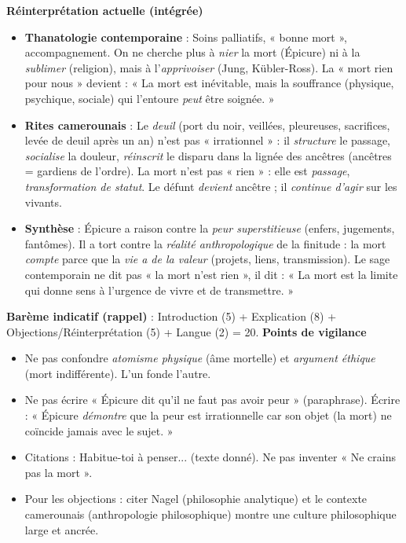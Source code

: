 \documentclass[11pt]{article}
\begin{document}
\begin{corrige}
\textbf{Réinterprétation actuelle (intégrée)}\par
\begin{itemize}
\item \textbf{Thanatologie contemporaine} : Soins palliatifs, « bonne mort », accompagnement. On ne cherche plus à \emph{nier} la mort (Épicure) ni à la \emph{sublimer} (religion), mais à l'\emph{apprivoiser} (Jung, Kübler-Ross). La « mort rien pour nous » devient : « La mort est inévitable, mais la souffrance (physique, psychique, sociale) qui l'entoure \emph{peut} être soignée. »
\item \textbf{Rites camerounais} : Le \emph{deuil} (port du noir, veillées, pleureuses, sacrifices, levée de deuil après un an) n'est pas « irrationnel » : il \emph{structure} le passage, \emph{socialise} la douleur, \emph{réinscrit} le disparu dans la lignée des ancêtres (ancêtres = gardiens de l'ordre). La mort n'est pas « rien » : elle est \emph{passage}, \emph{transformation de statut}. Le défunt \emph{devient} ancêtre ; il \emph{continue d'agir} sur les vivants.
\item \textbf{Synthèse} : Épicure a raison contre la \emph{peur superstitieuse} (enfers, jugements, fantômes). Il a tort contre la \emph{réalité anthropologique} de la finitude : la mort \emph{compte} parce que la \emph{vie a de la valeur} (projets, liens, transmission). Le sage contemporain ne dit pas « la mort n'est rien », il dit : « La mort est la limite qui donne sens à l'urgence de vivre et de transmettre. »
\end{itemize}

\textbf{Barème indicatif (rappel)} : Introduction (5) + Explication (8) + Objections/Réinterprétation (5) + Langue (2) = 20.
\textbf{Points de vigilance}\par
\begin{itemize}
\item Ne pas confondre \emph{atomisme physique} (âme mortelle) et \emph{argument éthique} (mort indifférente). L'un fonde l'autre.
\item Ne pas écrire « Épicure dit qu'il ne faut pas avoir peur » (paraphrase). Écrire : « Épicure \emph{démontre} que la peur est irrationnelle car son objet (la mort) ne coïncide jamais avec le sujet. »
\item Citations : \guillemotleft Habitue-toi à penser... \guillemotright (texte donné). Ne pas inventer « \guillemotleft Ne crains pas la mort \guillemotright ».
\item Pour les objections : citer Nagel (philosophie analytique) et le contexte camerounais (anthropologie philosophique) montre une culture philosophique large et ancrée.
\end{itemize}
\end{corrige}
\end{document}
